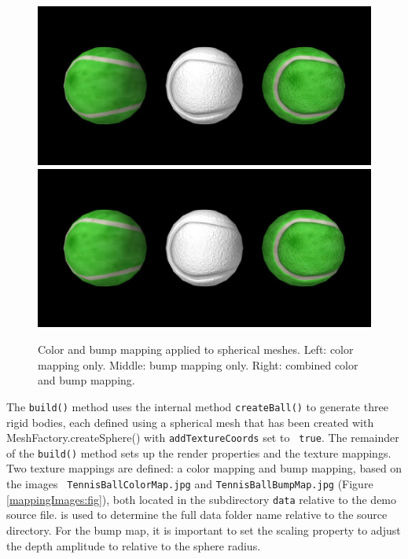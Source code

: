 \begin{figure}[ht]
\begin{center}
\iflatexml
 \includegraphics[]{images/sphericalMapping}
\else
 \includegraphics[width=4.5in]{images/sphericalMapping}
\fi
\end{center}
\caption{Color and bump mapping applied to spherical meshes. Left:
color mapping only. Middle: bump mapping only. Right: combined color
and bump mapping.}
\label{sphericalMapping:fig}
\end{figure}

\lstset{numbers=left}

\lstset{numbers=none}

The {\tt build()} method uses the internal method {\tt createBall()}
to generate three rigid bodies, each defined using a spherical mesh
that has been created with
%
{MeshFactory.createSphere()} with {\tt addTextureCoords} set to {\tt
true}.  The remainder of the {\tt build()} method sets up the render
properties and the texture mappings. Two texture mappings are defined:
a color mapping and bump mapping, based on the images {\tt
TennisBallColorMap.jpg} and {\tt TennisBallBumpMap.jpg} (Figure
\ref{mappingImages:fig}), both located in the subdirectory {\tt data}
relative to the demo source file.
 is used to determine
the full data folder name relative to the source directory.
For the bump map, it is important to set the {\sf scaling} property
to adjust the depth amplitude to relative to the sphere radius.

